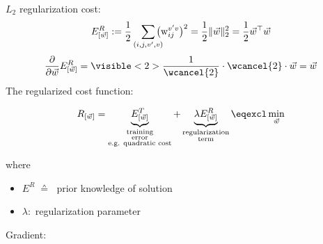 \begin{frame}

$L_2$ regularization cost:
\begin{equation}
E^R_{[\vec w]} := \frac{1}{2} \sum_{(i, j, v', v)} 
			\kern-2ex
			\big( \mathrm{w}_{ij}^{v'v} \big)^2 = \frac{1}{2} \lVert \vec w \rVert_2^2 = \frac{1}{2} \vec w^\top \vec w 
\end{equation}
\renewcommand{\CancelColor}{\color{gray}}
\begin{equation}
\frac{\partial}{\partial \vec w} E^R_{[\vec w]} = \visible<2>{
\frac{1}{\wcancel{2}} \cdot \wcancel{2} \cdot \vec w = \vec w
}
\end{equation}
\pause
The regularized cost function:

\begin{equation}
	R_{[\vec{w}]} = \underbrace{ E_{[\vec{w}]}^T }_{
			\substack{\text{training} \\ \text{error} \\ \text{e.g. quadratic cost}}}
		+ \underbrace{ \lambda E_{[\vec{w}]}^R }_{
			\substack{\text{regularization} \\ \text{term}}}
		\eqexcl \min_{\vec w}
\end{equation}

where 
\begin{itemize}
	\item $E^R \; \corresponds \; $ prior knowledge of solution
	\item $\lambda:$ regularization parameter 
\end{itemize}
\end{frame}

\begin{frame}
Gradient:

\end{frame}
